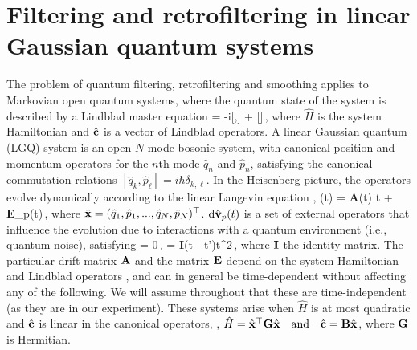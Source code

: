 \documentclass[./Main-revtex.tex]{subfiles}
\begin{document}

\section{Filtering and retrofiltering in linear Gaussian quantum systems}\label{sec:GeneralACDK}

The problem of quantum filtering, retrofiltering and smoothing applies to Markovian open quantum systems, where the quantum state of the system is described by a Lindblad master equation
\beq
\hbar{}\rho = -i[,\rho] + []\rho\,,
\label{equ:LindbladMasEq}
\eeq
where $\hat{H}$ is the system Hamiltonian and $\hat{\bf c}$ is a vector of Lindblad operators.
A linear Gaussian quantum (LGQ) system is an open $N$-mode bosonic system, with canonical position and momentum operators for the $n$th mode $\hat{q}_n$ and $\hat{p}_n$, satisfying the canonical commutation relations $[\hat{q}_k,\hat{p}_\ell] = i\hbar\delta_{k,\ell}$. In the Heisenberg picture, the operators evolve dynamically according to the linear Langevin equation \cite{DohJac99,wiseman2009quantum},
\beq
\dd {}(t) = {\bf A}\bx(t) \dd t + {\bf E}\dd{}_p(t)\,,
\eeq
where $\hat{\bf x} = (\hat{q}_1,\hat{p}_1,...,\hat{q}_N,\hat{p}_N)^\top$. ${\rm d}\hat{\bf v}_p(t)$ is a set of external operators that influence the evolution due to interactions with a quantum environment (i.e., quantum noise), satisfying
\beq\label{eq:WhtQNoise}
 = 0\,,  \quad {} = {\bf I}\delta(t - t')\dd t^2\,,
\eeq 
where ${\bf I}$ the identity matrix. The particular drift matrix ${\bf A}$ and the matrix ${\bf E}$ depend on the system Hamiltonian and Lindblad operators \cite{wiseman2009quantum}, and can in general be time-dependent without affecting any of the following. We will assume throughout that these are time-independent (as they are in our experiment).
These systems arise when $\hat{H}$ is at most quadratic and $\hat{\bf c}$ is linear in the canonical operators, \eg, $\hat{H} = \hat{\bf x}^\top {\bf G} \hat{\bf x}\quad{\rm and} \quad \hat{\bf c} = {\bf B}\hat{\bf x}$, where ${\bf G}$ is Hermitian. 
\end{document}
